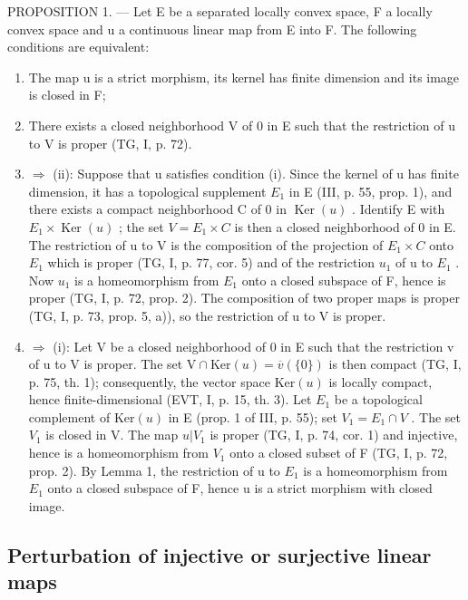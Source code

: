 PROPOSITION 1. --- Let E be a separated locally convex space, F a locally convex space and u a continuous linear map from E into F. The following conditions are equivalent:

\begin{enumerate}
\def\labelenumi{(\roman{enumi})}
\item
  The map u is a strict morphism, its kernel has finite dimension and its image is closed in F;
\item
  There exists a closed neighborhood V of 0 in E such that the restriction of u to V is proper (TG, I, p. 72).
\item
  \(\Longrightarrow\) (ii): Suppose that u satisfies condition (i). Since the kernel of u has finite dimension, it has a topological supplement \(E_{1}\) in E (III, p. 55, prop. 1), and there exists a compact neighborhood C of 0 in \(\operatorname{Ker}(u)\) . Identify E with \(E_{1} \times \operatorname{Ker}(u)\) ; the set \(V = E_{1} \times C\) is then a closed neighborhood of 0 in E. The restriction of u to V is the composition of the projection of \(E_{1} \times C\) onto \(E_{1}\) which is proper (TG, I, p. 77, cor. 5) and of the restriction \(u_{1}\) of u to \(E_{1}\) . Now \(u_{1}\) is a homeomorphism from \(E_{1}\) onto a closed subspace of F, hence is proper (TG, I, p. 72, prop. 2). The composition of two proper maps is proper (TG, I, p. 73, prop. 5, a)), so the restriction of u to V is proper.
\item
  \(\Longrightarrow\) (i): Let V be a closed neighborhood of 0 in E such that the restriction v of u to V is proper. The set \(\mathrm{V} \cap \mathrm{Ker}(u) = \overline{v}(\{0\})\) is then compact (TG, I, p. 75, th. 1); consequently, the vector space \(\mathrm{Ker}(u)\) is locally compact, hence finite-dimensional (EVT, I, p. 15, th. 3). Let \(E_{1}\) be a topological complement of \(\mathrm{Ker}(u)\) in E (prop. 1 of III, p. 55); set \(V_{1} = E_{1} \cap V\) . The set \(V_{1}\) is closed in V. The map \(u|V_{1}\) is proper (TG, I, p. 74, cor. 1) and injective, hence is a homeomorphism from \(V_{1}\) onto a closed subset of F (TG, I, p. 72, prop. 2). By Lemma 1, the restriction of u to \(E_{1}\) is a homeomorphism from \(E_{1}\) onto a closed subspace of F, hence u is a strict morphism with closed image.
\end{enumerate}

\subsection{Perturbation of injective or surjective linear maps}

